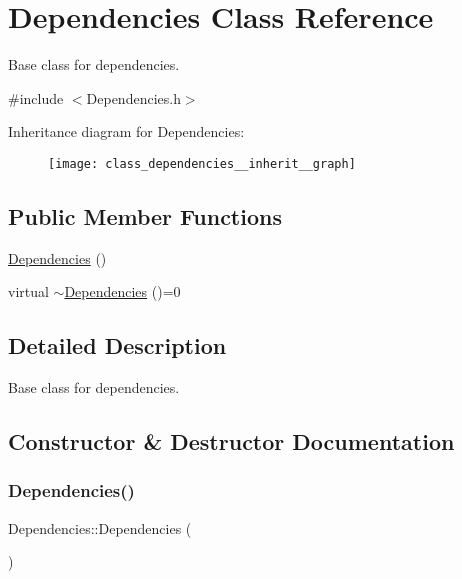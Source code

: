 \hypertarget{class_dependencies}{}\section{Dependencies Class Reference}
\label{class_dependencies}


Base class for dependencies.  




{\ttfamily \#include $<$Dependencies.\+h$>$}



Inheritance diagram for Dependencies\+:
\nopagebreak
\begin{figure}[H]
\begin{center}
\leavevmode
\texttt{[image: class\_dependencies\_\_inherit\_\_graph]}
\end{center}
\end{figure}
\subsection*{Public Member Functions}
\begin{DoxyCompactItemize}
\item 
\hyperlink{class_dependencies_afb4e8de48db17417cb0b3e5b57a17af4}{Dependencies} ()
\item 
virtual \hyperlink{class_dependencies_aeaa0706664765dd19c545f9683bf1aea}{$\sim$\+Dependencies} ()=0
\end{DoxyCompactItemize}


\subsection{Detailed Description}
Base class for dependencies. 

\subsection{Constructor \& Destructor Documentation}
\mbox{\label{class_dependencies_afb4e8de48db17417cb0b3e5b57a17af4}} 
\subsubsection{\texorpdfstring{Dependencies()}{Dependencies()}}
{\footnotesize\ttfamily Dependencies\+::\+Dependencies (\begin{DoxyParamCaption}{ }\end{DoxyParamCaption})}

